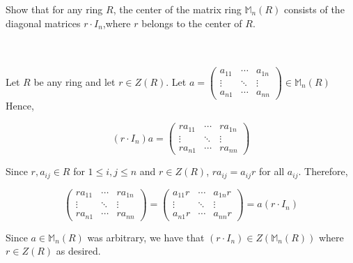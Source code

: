 Show that for any ring $R$, the center of the matrix ring $\mathbb{M}_n(R)$ consists of the
diagonal matrices $r\cdot I_n$,where $r$ belongs to the center of $R$.\\\\

\begin{solution}\renewcommand{\qedsymbol}{}\ \\
    Let $R$ be any ring and let $r\in Z(R)$. Let
    $a=\left(\begin{array}{ccc} a_{11} & \cdots & a_{1n} \\ \vdots & \ddots & \vdots
                             \\ a_{n1} & \cdots & a_{nn} \end{array}\right)\in\mathbb{M}_n(R)$ 
    Hence,

    $$(r\cdot I_n)a=\left(\begin{array}{ccc} ra_{11} & \cdots & ra_{1n} \\ \vdots & \ddots & \vdots
                                          \\ ra_{n1} & \cdots & ra_{nn} \end{array}\right)$$

    Since $r,a_{ij}\in R$ for $1\leq i,j\leq n$ and $r\in Z(R)$, $ra_{ij}=a_{ij}r$ for all $a_{ij}$.
    Therefore,

    $$\left(\begin{array}{ccc} ra_{11} & \cdots & ra_{1n} \\ \vdots & \ddots & \vdots
                            \\ ra_{n1} & \cdots & ra_{nn} \end{array}\right)
     =\left(\begin{array}{ccc} a_{11}r & \cdots & a_{1n}r \\ \vdots & \ddots & \vdots
                            \\ a_{n1}r & \cdots & a_{nn}r \end{array}\right)=a(r\cdot I_n)$$
    
    Since $a\in\mathbb{M}_n(R)$ was arbitrary, we have that $(r\cdot I_n)\in Z(\mathbb{M}_n(R))$ where
    $r\in Z(R)$ as desired.


\end{solution}